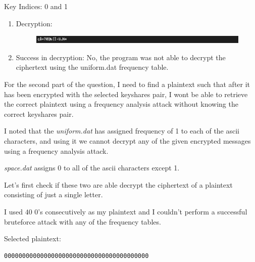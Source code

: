 \documentclass{ashoka-crypto}
\begin{document}
\begin{enumerate}
\begin{enumerate}
Key Indices: 0 and 1
\begin{enumerate}
\item Decryption:
\begin{figure}[h]
\includegraphics[width=12cm]{3_4_uniform}
\centering
\end{figure}

\item Success in decryption: No, the program was not able to decrypt the ciphertext using the uniform.dat frequency table.
\end{enumerate}
\end{enumerate}
\end{enumerate}

For the second part of the question, I need to find a plaintext such that after it has been encrypted with the selected keyshares pair, I wont be able to retrieve the correct plaintext using a frequency analysis attack without knowing the correct keyshares pair.

I noted that the \textit{uniform.dat} has assigned frequency of 1 to each of the ascii characters, and using it we cannot decrypt any of the given encrypted messages using a frequency analysis attack.

\textit{space.dat} assigns $0$ to all of the ascii characters except 1.

Let's first check if these two are able decrypt the ciphertext of a plaintext consisting of just a single letter.

I used $40$ $0$'s consecutively as my plaintext and I couldn't perform a successful bruteforce attack with any of the frequency tables.

Selected plaintext:
\begin{verbatim}
0000000000000000000000000000000000000000
\end{verbatim}
\end{document}
